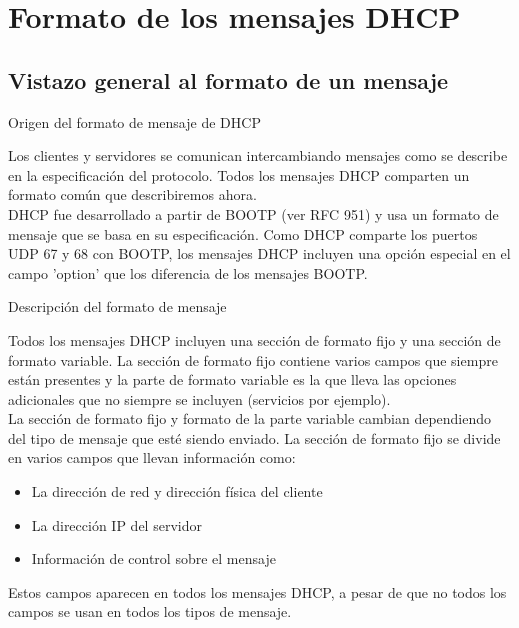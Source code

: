 



\section{Formato de los mensajes DHCP} %
\label{sec:Formato de los mensajes DHCP}


\subsection{Vistazo general al formato de un mensaje} %


\begin{frame}[fragile]{Origen del formato de mensaje de DHCP}

    Los clientes y servidores se comunican intercambiando mensajes como se
    describe en la especificación del protocolo. Todos los mensajes DHCP
    comparten un formato común que describiremos ahora.\\[0.2cm]

    DHCP fue desarrollado a partir de BOOTP (ver RFC 951) y usa un formato de
    mensaje que se basa en su especificación. Como DHCP comparte los puertos
    UDP 67 y 68 con BOOTP, los mensajes DHCP incluyen una opción especial en el
    campo 'option' que los diferencia de los mensajes BOOTP.\\[0.2cm]

\end{frame} 

\begin{frame}[fragile]{Descripción del formato de mensaje}

    Todos los mensajes DHCP incluyen una sección de formato fijo y una sección
    de formato variable. La sección de formato fijo contiene varios campos que
    siempre están presentes y la parte de formato variable es la que lleva las
    opciones adicionales que no siempre se incluyen (servicios por
    ejemplo).\\[0.2cm]

    La sección de formato fijo y formato de la parte variable cambian
    dependiendo del tipo de mensaje que esté siendo enviado. La sección de
    formato fijo se divide en varios campos que llevan información como:
    \begin{itemize}
        \item La dirección de red y dirección física del cliente
        \item La dirección IP del servidor
        \item Información de control sobre el mensaje
    \end{itemize}

    Estos campos aparecen en todos los mensajes DHCP, a pesar de que no todos
    los campos se usan en todos los tipos de mensaje.

\end{frame}

